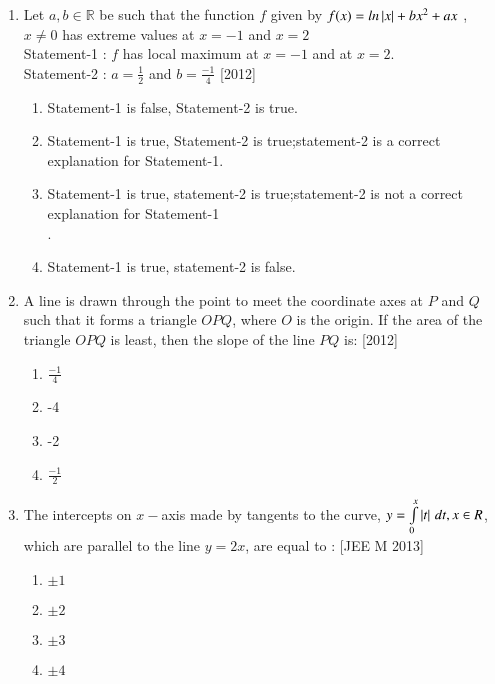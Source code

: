 \documentclass[journal,12pt,twocolumn]{IEEEtran}
\theoremstyle{remark}
\begin{document}
\begin{enumerate}
\item Let $a, b\in \mathbb R$ be such that the function $f$ given by $f(x)=ln\left\vert x\right\vert+bx^{2}+ax$ , 
$x \neq 0$ has extreme values at $x=-1$ and $x=2$\\
Statement-1 : $f$ has local maximum at $x=-1$ and at $x=2$.\\
Statement-2 : $a=\frac{1}{2}$ and $b=\frac{-1}{4}$ \hfill{[2012]}\\
\begin{enumerate}
    \item Statement-1 is false, Statement-2 is true.\\
    \item Statement-1 is true, Statement-2 is true;statement-2 is a correct explanation for Statement-1.\\
    \item Statement-1 is true, statement-2 is true;statement-2 is not a correct explanation for Statement-1\\.
    \item Statement-1 is true, statement-2 is false.\\
\end{enumerate}

\item A line is drawn through the point to meet the coordinate axes at $P$ and $Q$ such that it forms a triangle $OPQ$, where $O$ is the origin. If the area of the triangle $OPQ$ is least, then the slope of the line $PQ$ is: \hfill{[2012]}\\
\begin{enumerate}
    \item  $\frac{-1}{4}$\\
    \item  -4\\
    \item  -2\\
    \item  $\frac{-1}{2}$\\
\end{enumerate}
\item The intercepts on $x-$axis made by tangents to the curve, $y=\int\limits_0^x\left\vert t\right\vert \, dt, x\in R$, which are parallel to the line $y=2x$, are equal to : {[JEE M 2013]}\\
\begin{enumerate}
    \item  $\pm1$\\
    \item  $\pm2$\\
    \item  $\pm3$\\
    \item  $\pm4$\\
    

\end{enumerate}
\end{enumerate}
\end{document}
